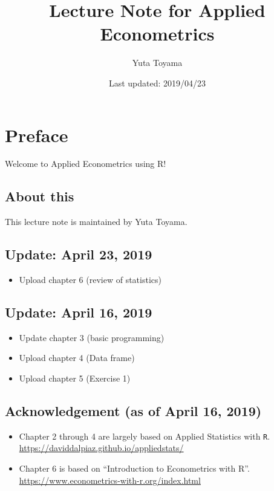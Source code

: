 \documentclass[]{book}
\title{Lecture Note for Applied Econometrics}
\author{Yuta Toyama}
\date{Last updated: 2019/04/23}
\providecommand{\tightlist}{%
  \setlength{\itemsep}{0pt}\setlength{\parskip}{0pt}}
\begin{document}
\maketitle

{
\setcounter{tocdepth}{1}
\tableofcontents
}
\chapter{Preface}\label{preface}

Welcome to Applied Econometrics using R!

\section{About this}\label{about-this}

This lecture note is maintained by Yuta Toyama.

\section{Update: April 23, 2019}\label{update-april-23-2019}

\begin{itemize}
\tightlist
\item
  Upload chapter 6 (review of statistics)
\end{itemize}

\section{Update: April 16, 2019}\label{update-april-16-2019}

\begin{itemize}
\tightlist
\item
  Update chapter 3 (basic programming)
\item
  Upload chapter 4 (Data frame)
\item
  Upload chapter 5 (Exercise 1)
\end{itemize}

\section{Acknowledgement (as of April 16,
2019)}\label{acknowledgement-as-of-april-16-2019}

\begin{itemize}
\tightlist
\item
  Chapter 2 through 4 are largely based on Applied Statistics with
  \texttt{R}. \url{https://daviddalpiaz.github.io/appliedstats/}
\item
  Chapter 6 is based on ``Introduction to Econometrics with R''.
  \url{https://www.econometrics-with-r.org/index.html}
\end{itemize}
\end{document}
